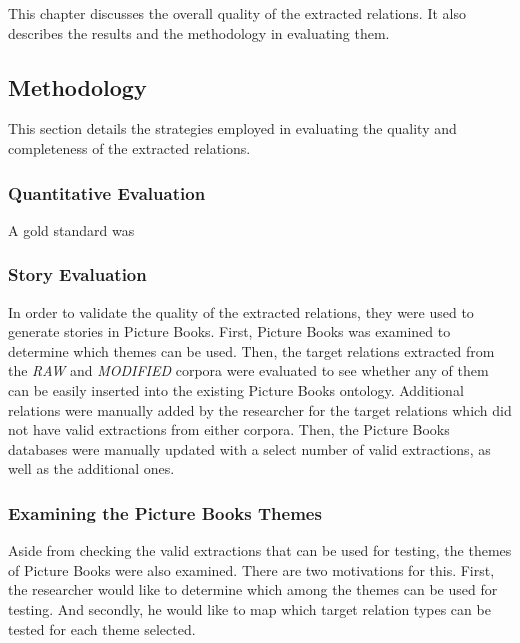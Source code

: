 %
%
%                 

\label{sec:resultsandanalysis}

This chapter discusses the overall quality of the extracted relations. It also describes the results and the methodology in evaluating them.

\subsection{Methodology}
\label{sec:methodology}

This section details the strategies employed in evaluating the quality and completeness of the extracted relations.

\subsubsection{Quantitative Evaluation}

A gold standard was 

\subsubsection{Story Evaluation}

In order to validate the quality of the extracted relations, they were used to generate stories in Picture Books. First, Picture Books was examined to determine which themes can be used. Then, the target relations extracted from the \textit{RAW} and \textit{MODIFIED} corpora were evaluated to see whether any of them can be easily inserted into the existing Picture Books ontology. Additional relations were manually added by the researcher for the target relations which did not have valid extractions from either corpora. Then, the Picture Books databases were manually updated with a select number of valid extractions, as well as the additional ones. 

\subsubsection*{Examining the Picture Books Themes}
\label{sec:examinethemes}

Aside from checking the valid extractions that can be used for testing, the themes of Picture Books were also examined. There are two motivations for this. First, the researcher would like to determine which among the themes can be used for testing. And secondly, he would like to map which target relation types can be tested for each theme selected.

